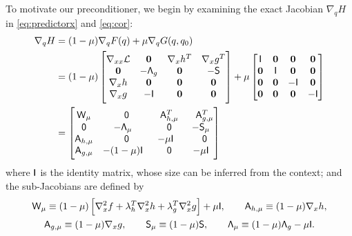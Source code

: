  To motivate our preconditioner,
we begin by examining the exact Jacobian $\nabla_q H$ in  \eqref{eq:predictorx} and \eqref{eq:cor}:
\begin{equation}\label{eq:dHdq}
\begin{aligned}
\nabla_q H &= (1 - \mu) \nabla_{q} F(q) + \mu \nabla_q G(q,q_0) \\
&=  (1-\mu)\begin{bmatrix}
 \nabla_{xx} \mathcal{L}   & \boldsymbol{0} & \nabla_x h^T   &  \nabla_x g^T   \\   %
\boldsymbol{0}     &   - \mat{\Lambda}_g   & \boldsymbol{0} & -\mathsf{S}     \\
\nabla_x h &  \boldsymbol{0}   & \boldsymbol{0} &  \boldsymbol{0}  \\
\nabla_x g  & -\mathsf{I}  &  \boldsymbol{0}  & \boldsymbol{0}   \\
\end{bmatrix}
+ \mu \begin{bmatrix}
\mathsf{I} & \boldsymbol{0} & \boldsymbol{0} & \boldsymbol{0} \\
\boldsymbol{0}  & \mathsf{I}  & \boldsymbol{0} & \boldsymbol{0} \\
\boldsymbol{0} & \boldsymbol{0} & -\mathsf{I} &  \boldsymbol{0} \\
\boldsymbol{0} & \boldsymbol{0} &   \boldsymbol{0} & -\mathsf{I} 
\end{bmatrix} \\
& = \begin{bmatrix}
	\mat{W}_\mu & \phantom{-}\mat{0} & \phantom{-}\mat{A}_{h,\mu}^T  & \phantom{-}\mat{A}_{g,\mu}^T \\
	\mat{0}  & -\mat{\Lambda}_\mu & \phantom{-}\mat{0}   & -\mat{S}_\mu \\
	\mat{A}_{h, \mu} & \phantom{-}\mat{0} &  -\mu \mat{I} & \phantom{-}\mat{0}  \\
	\mat{A}_{g, \mu} & -(1-\mu)\mat{I} &  \phantom{-}\mat{0}     &   -\mu \mat{I}
\end{bmatrix}
\end{aligned}
\end{equation}
where $\mathsf{I}$ is the identity matrix, whose size can be inferred from the context; 
and the sub-Jacobians are defined by
\begin{gather*}
	\mathsf{W}_{\mu} \equiv (1-\mu) \left[\nabla_x^2 f + \lambda_h^T \nabla_x^2 h  + \lambda_g^T \nabla_x^2 g\right] + \mu \mathsf{I},\qquad
	\mathsf{A}_{h, \mu} \equiv (1-\mu) \nabla_x h, \\
	\mathsf{A}_{g, \mu} \equiv (1-\mu) \nabla_x g, \qquad 
	\mathsf{S}_{\mu} \equiv (1-\mu)\mathsf{S},\qquad
	\mathsf{\Lambda}_\mu \equiv (1-\mu)  \mathsf{\Lambda}_g - \mu \mathsf{I}. 
\end{gather*}


